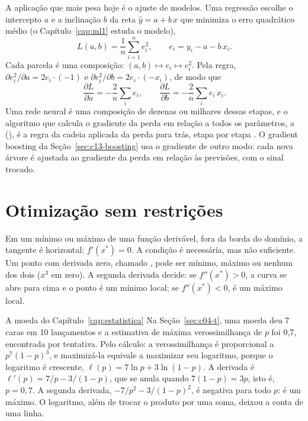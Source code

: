 A aplicação que mais pesa hoje é o ajuste de modelos. Uma regressão escolhe o intercepto $a$ e a inclinação $b$ da reta $\hat y = a + b\,x$ que minimiza o erro quadrático médio (o Capítulo~\ref{cap:ml1} estuda o modelo),
\begin{equation}
  L(a, b) = \frac{1}{n}\sum_{i=1}^{n} e_i^2 , \qquad e_i = y_i - a - b\,x_i .
  \label{eq:c05-perda}
\end{equation}
Cada parcela é uma composição: $(a, b) \mapsto e_i \mapsto e_i^2$. Pela regra, $\partial e_i^2/\partial a = 2e_i \cdot (-1)$ e $\partial e_i^2/\partial b = 2e_i \cdot (-x_i)$, de modo que
\begin{equation}
  \frac{\partial L}{\partial a} = -\frac{2}{n}\sum_i e_i , \qquad
  \frac{\partial L}{\partial b} = -\frac{2}{n}\sum_i e_i\,x_i .
  \label{eq:c05-grad-perda}
\end{equation}
Uma rede neural é uma composição de dezenas ou milhares dessas etapas, e o algoritmo que calcula o gradiente da perda em relação a todos os parâmetros, a  (), é a regra da cadeia aplicada da perda para trás, etapa por etapa \citep{rumelhart1986}. O gradient boosting da Seção~\ref{sec:c13-boosting} usa o gradiente de outro modo: cada nova árvore é ajustada ao gradiente da perda em relação às previsões, com o sinal trocado.

\section{Otimização sem restrições}
\label{sec:c05-otimizacao}

Em um mínimo ou máximo de uma função derivável, fora da borda do domínio, a tangente é horizontal: $f'(x^{\ast}) = 0$. A condição é necessária, mas não suficiente. Um ponto com derivada zero, chamado , pode ser mínimo, máximo ou nenhum dos dois ($x^3$ em zero). A segunda derivada decide: se $f''(x^{\ast}) > 0$, a curva se abre para cima e o ponto é um mínimo local; se $f''(x^{\ast}) < 0$, é um máximo local.

\begin{exemplo}{A moeda do Capítulo~\ref{cap:estatistica}}
Na Seção~\ref{sec:c04-t}, uma moeda deu 7 caras em 10 lançamentos e a estimativa de máxima verossimilhança de $p$ foi 0,7, encontrada por tentativa. Pelo cálculo: a verossimilhança é proporcional a $p^7(1-p)^3$, e maximizá-la equivale a maximizar seu logaritmo, porque o logaritmo é crescente, $\ell(p) = 7\ln p + 3\ln(1-p)$. A derivada é $\ell'(p) = 7/p - 3/(1-p)$, que se anula quando $7(1-p) = 3p$, isto é, $p = 0,7$. A segunda derivada, $-7/p^2 - 3/(1-p)^2$, é negativa para todo $p$: é um máximo. O logaritmo, além de trocar o produto por uma soma, deixou a conta de uma linha.
\end{exemplo}

